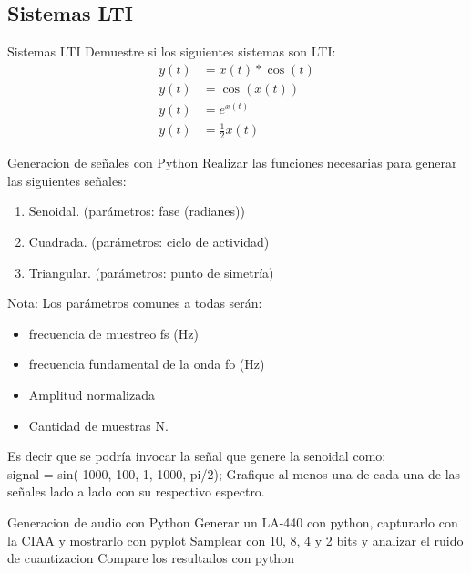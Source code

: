  \subsection{Sistemas LTI}
 \begin{frame}{Sistemas LTI}
 Demuestre si los siguientes sistemas son LTI:\\
 \begin{align*}
    y(t) &= x(t)*\cos{(t)} \\
    y(t) &= \cos(x(t)) \\
    y(t) &= e^{x(t)} \\
    y(t) &= \frac{1}{2}x(t)
 \end{align*}
    \vfill
 \end{frame}
 \begin{frame}{Generacion de señales con Python}
    Realizar las funciones necesarias para generar las siguientes señales:
    \begin{enumerate}
       \item {Senoidal. (parámetros: fase (radianes))}
       \item {Cuadrada. (parámetros: ciclo de actividad)}
       \item {Triangular. (parámetros: punto de simetría)}
    \end{enumerate}
    Nota: Los parámetros comunes a todas serán:
    \begin{itemize}
       \item {frecuencia de muestreo fs (Hz) }
       \item {frecuencia fundamental de la onda fo (Hz) }
       \item {Amplitud normalizada }
       \item {Cantidad de muestras N. }
    \end{itemize}
        Es decir que se podría invocar la señal que genere la senoidal como: \\
        signal = sin( 1000, 100, 1, 1000, pi/2);
        Grafique al menos una de cada una de las señales lado a lado con su respectivo espectro.
    \vfill
 \end{frame}
 \begin{frame}{Generacion de audio con Python}
   Generar un LA-440 con python, capturarlo con la CIAA y mostrarlo con pyplot
   Samplear con 10, 8, 4 y 2 bits y analizar el ruido de cuantizacion
   Compare los resultados con python
 \end{frame}
